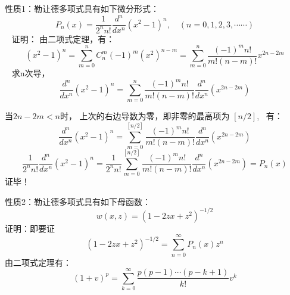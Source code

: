 \begin{frame}
	\alert{性质1}：勒让德多项式具有如下微分形式：
	\begin{equation*}
		P_{n}(x)=\frac{1}{2^{n} n !} \frac{d^{n}}{d x^{n}}\left(x^{2}-1\right)^{n}, \quad(n=0,1,2,3, \cdots \cdots)
	\end{equation*}	 
	\alert{证明：} 由二项式定理，有：
	\begin{equation*}
		\left(x^{2}-1\right)^{n}=\sum_{m=0}^{n} C_{n}^{m}(-1)^{m}\left(x^{2}\right)^{n-m}=\sum_{m=0}^{n} \frac{(-1)^{m} n !}{m !(n-m) !} x^{2 n-2 m}
	\end{equation*}	 
	求n次导，
	\begin{equation*}
		\frac{d^{n}}{d x^{n}}\left(x^{2}-1\right)^{n}=\sum_{m=0}^{n} \frac{(-1)^{m} n !}{m !(n-m) !} \frac{d^{n}}{d x^{n}}\left(x^{2 n-2 m}\right)
	\end{equation*}	
\end{frame}	

\begin{frame}
	当$2n-2m<n$时， 上次的右边导数为零，即非零的最高项为 $[n/2]$,  有：
	\begin{equation*}
		\frac{d^{n}}{d x^{n}}\left(x^{2}-1\right)^{n}=\sum_{m=0}^{[n/2]} \frac{(-1)^{m} n !}{m !(n-m) !} \frac{d^{n}}{d x^{n}}\left(x^{2 n-2 m}\right)
	\end{equation*}	
	\begin{equation*}
		\frac{1}{2^{n} n !} \frac{d^{n}}{d x^{n}}\left(x^{2}-1\right)^{n}=\frac{1}{2^{n} n !} \sum_{m=0}^{[n/2]} \frac{(-1)^{m} n !}{m !(n-m) !} \frac{d^{n}}{d x^{n}}\left(x^{2 n-2 m}\right)=P_n(x)
	\end{equation*}	
	\alert{证毕！}
\end{frame}	

\begin{frame}
	\alert{性质2：}勒让德多项式具有如下母函数：
	\begin{equation*}
		w(x, z)=\left(1-2 z x+z^{2}\right)^{-1 / 2}
	\end{equation*}	
	\alert{证明：}即要证
	\begin{equation*}
		\left(1-2 z x+z^{2}\right)^{-1 / 2}=\sum_{n=0}^{\infty} P_n(x) z^n
	\end{equation*}	
	由二项式定理有：
	\begin{equation*}
		(1+v)^{p}=\sum_{k=0}^{\infty} \frac{p(p-1) \cdots(p-k+1)}{k !} v^{k}
	\end{equation*}	
\end{frame}	

